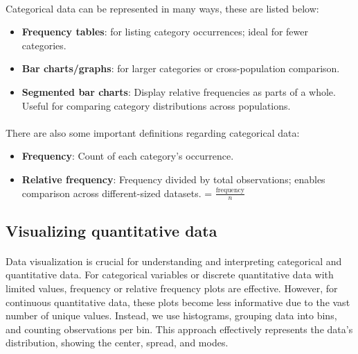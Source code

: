 \documentclass{article}
\begin{document}
\paragraph{}
Categorical data can be represented in many ways, these are listed below:

\begin{itemize}
    \item \textbf{Frequency tables}: for listing category occurrences; ideal for fewer categories.
    \item \textbf{Bar charts/graphs}: for larger categories or cross-population comparison.
    \item \textbf{Segmented bar charts}: Display relative frequencies as parts of a whole. Useful for comparing category distributions across populations.
\end{itemize}

\paragraph{}
There are also some important definitions regarding categorical data:

\begin{itemize}
    \item \textbf{Frequency}: Count of each category's occurrence.
    \item \textbf {Relative frequency}: Frequency divided by total observations; enables comparison across different-sized datasets.  = $\frac{\text{frequency}}{n}$
\end{itemize}






\subsection{Visualizing quantitative data}
\paragraph{}
Data visualization is crucial for understanding and interpreting categorical and quantitative data. For categorical variables or discrete quantitative data with limited values, frequency or relative frequency plots are effective. However, for continuous quantitative data, these plots become less informative due to the vast number of unique values. Instead, we use histograms, grouping data into bins, and counting observations per bin. This approach effectively represents the data's distribution, showing the center, spread, and modes.
\end{document}
